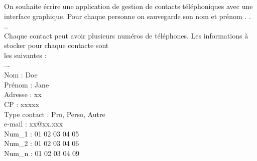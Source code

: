 \documentclass[a4paper, 11pt]{article}
\begin{document}
\hspace{-1.5em}On souhaite écrire une application de gestion de contacts téléphoniques avec une\\
interface graphique. Pour chaque personne on sauvegarde son nom et prénom . . ..\\
Chaque contact peut avoir plusieurs numéros de téléphones. Les informations à stocker pour chaque contacte sont\\ les suivantes :\\
–-\\
Nom : Doe\\
Prénom : Jane\\
Adresse : xx\\
CP : xxxxx\\
Type contact : Pro, Perso, Autre\\
e-mail : xx@xx.xxx\\
Num_1 : 01 02 03 04 05\\
Num_2 : 01 02 03 04 06\\
Num_n : 01 02 03 04 09 \\


\newpage
\end{document}
